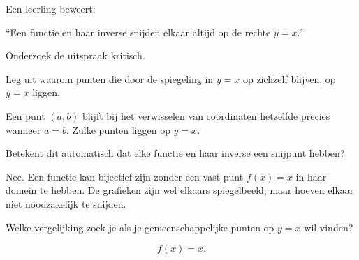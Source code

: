 \documentclass{ximera}
\begin{document}
\begin{oefening}{\oefG}

Een leerling beweert:

\begin{center}
``Een functie en haar inverse snijden elkaar altijd op de rechte \(y=x\).''
\end{center}

Onderzoek de uitspraak kritisch.

\begin{question}
Leg uit waarom punten die door de spiegeling in \(y=x\) op zichzelf blijven,
op \(y=x\) liggen.

\begin{oplossing}
Een punt \((a,b)\) blijft bij het verwisselen van coördinaten hetzelfde
precies wanneer \(a=b\). Zulke punten liggen op \(y=x\).
\end{oplossing}
\end{question}

\begin{question}
Betekent dit automatisch dat elke functie en haar inverse een snijpunt hebben?

\begin{oplossing}
Nee. Een functie kan bijectief zijn zonder een vast punt \(f(x)=x\)
in haar domein te hebben. De grafieken zijn wel elkaars spiegelbeeld,
maar hoeven elkaar niet noodzakelijk te snijden.
\end{oplossing}
\end{question}

\begin{question}
Welke vergelijking zoek je als je gemeenschappelijke punten op \(y=x\)
wil vinden?

\begin{oplossing}
\[
f(x)=x.
\]
\end{oplossing}
\end{question}

\end{oefening}
\end{document}
